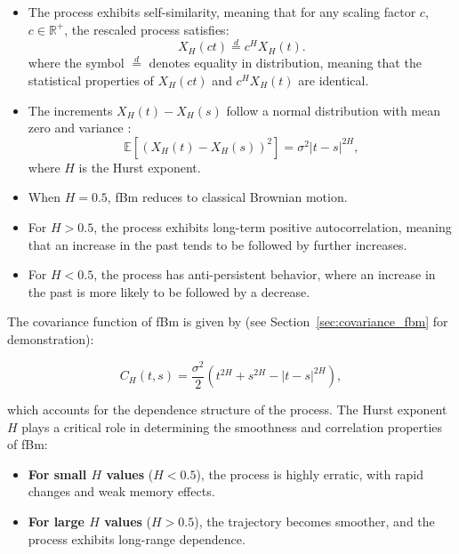 \documentclass[11pt]{extarticle}
\begin{document}
\begin{itemize}
    \item The process exhibits self-similarity, meaning that for any scaling factor \( c \), \( c \in \mathbb{R}^+ \), the rescaled process satisfies:
    \begin{equation}
        X_H(ct) \overset{d}{=} c^H X_H(t).
    \end{equation}
    where the symbol \(\stackrel{d}{=}\) denotes equality in distribution, meaning that the statistical properties of \(X_H(ct)\) and \(c^H X_H(t)\) are identical.

    \item The increments \( X_H(t) - X_H(s) \) follow a normal distribution with mean zero and variance :
    \begin{equation}
        \mathbb{E} \left[ (X_H(t) - X_H(s))^2 \right] = \sigma^2|t - s|^{2H},
    \end{equation}
    where \( H \) is the Hurst exponent.

    \item When \( H = 0.5 \), fBm reduces to classical Brownian motion.
    \item For \( H > 0.5 \), the process exhibits long-term positive autocorrelation, meaning that an increase in the past tends to be followed by further increases.
    \item For \( H < 0.5 \), the process has anti-persistent behavior, where an increase in the past is more likely to be followed by a decrease.
\end{itemize}

The covariance function of fBm is given by (see Section~\ref{sec:covariance_fbm} for demonstration):

\begin{equation}
    C_H(t, s) = \frac{\sigma^2}{2} \left( t^{2H} + s^{2H} - |t - s|^{2H} \right),
    \label{eq:fbm_covariance}
\end{equation}

which accounts for the dependence structure of the process. The Hurst exponent \( H \) plays a critical role in determining the smoothness and correlation properties of fBm:

\begin{itemize}
    \item \textbf{For small \( H \) values} (\( H < 0.5 \)), the process is highly erratic, with rapid changes and weak memory effects.
    \item \textbf{For large \( H \) values} (\( H > 0.5 \)), the trajectory becomes smoother, and the process exhibits long-range dependence.
\end{itemize}
\end{document}
